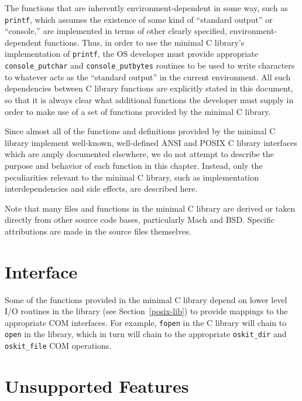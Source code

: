 The functions that are inherently environment-dependent in some way,
such as {\tt printf}, which assumes
the existence of some kind of ``standard output'' or ``console,''
are implemented in terms of other
clearly specified, environment-dependent functions.
Thus, in order to use the minimal C library's implementation of {\tt printf},
the OS developer must provide appropriate {\tt console_putchar}
and {\tt console_putbytes} routines
to be used to write characters to whatever acts as the ``standard output''
in the current environment.
All such dependencies between C library functions
are explicitly stated in this document,
so that it is always clear what additional functions the developer must supply
in order to make use of a set of functions provided by the minimal C library.

Since almost all of the functions and definitions
provided by the \oskit{} minimal C library
implement well-known, well-defined ANSI and POSIX C library interfaces
which are amply documented elsewhere,
we do not attempt to describe the purpose and behavior
of each function in this chapter.
Instead, only the peculiarities relevant to the minimal C library,
such as implementation interdependencies and side effects,
are described here.


Note that many files and functions in the minimal C library
are derived or taken directly from other source code bases,
particularly Mach and BSD\@.
Specific attributions are made in the source files themselves.

\section{\textnormal{\posix{}} Interface}

Some of the functions provided in the minimal C library depend on lower
level I/O routines in the \posix{} library (see Section~\ref{posix-lib}) to
provide mappings to the appropriate \oskit{} COM interfaces. For example,
\texttt{fopen} in the C library will chain to \texttt{open} in the \posix{}
library, which in turn will chain to the appropriate {\tt oskit_dir} and
{\tt oskit_file} COM operations.

\section{Unsupported Features}
\label{libc-unsup}

